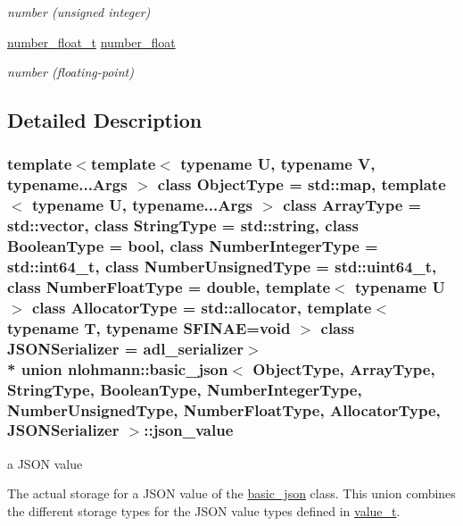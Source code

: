 \begin{DoxyCompactItemize}
\begin{DoxyCompactList}\small\item\em number (unsigned integer) \end{DoxyCompactList}\item 
\hyperlink{classnlohmann_1_1basic__json_a88d6103cb3620410b35200ee8e313d97}{number\+\_\+float\+\_\+t} \hyperlink{unionnlohmann_1_1basic__json_1_1json__value_ad003495e39e78b8096e0b6fc690d146f}{number\+\_\+float}
\begin{DoxyCompactList}\small\item\em number (floating-\/point) \end{DoxyCompactList}\end{DoxyCompactItemize}


\subsection{Detailed Description}
\subsubsection*{template$<$template$<$ typename U, typename V, typename...\+Args $>$ class Object\+Type = std\+::map, template$<$ typename U, typename...\+Args $>$ class Array\+Type = std\+::vector, class String\+Type = std\+::string, class Boolean\+Type = bool, class Number\+Integer\+Type = std\+::int64\+\_\+t, class Number\+Unsigned\+Type = std\+::uint64\+\_\+t, class Number\+Float\+Type = double, template$<$ typename U $>$ class Allocator\+Type = std\+::allocator, template$<$ typename T, typename S\+F\+I\+N\+A\+E=void $>$ class J\+S\+O\+N\+Serializer = adl\+\_\+serializer$>$\\*
union nlohmann\+::basic\+\_\+json$<$ Object\+Type, Array\+Type, String\+Type, Boolean\+Type, Number\+Integer\+Type, Number\+Unsigned\+Type, Number\+Float\+Type, Allocator\+Type, J\+S\+O\+N\+Serializer $>$\+::json\+\_\+value}

a J\+S\+ON value 

The actual storage for a J\+S\+ON value of the \hyperlink{classnlohmann_1_1basic__json}{basic\+\_\+json} class. This union combines the different storage types for the J\+S\+ON value types defined in \hyperlink{classnlohmann_1_1basic__json_ae8cbef097f7da18a781fc86587de6b90}{value\+\_\+t}.

